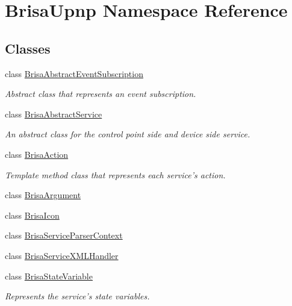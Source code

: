 \hypertarget{namespaceBrisaUpnp}{
\section{BrisaUpnp Namespace Reference}
\label{namespaceBrisaUpnp}
}
\subsection*{Classes}
\begin{DoxyCompactItemize}
\item 
class \hyperlink{classBrisaUpnp_1_1BrisaAbstractEventSubscription}{BrisaAbstractEventSubscription}
\begin{DoxyCompactList}\small\item\em Abstract class that represents an event subscription. \item\end{DoxyCompactList}\item 
class \hyperlink{classBrisaUpnp_1_1BrisaAbstractService}{BrisaAbstractService}
\begin{DoxyCompactList}\small\item\em An abstract class for the control point side and device side service. \item\end{DoxyCompactList}\item 
class \hyperlink{classBrisaUpnp_1_1BrisaAction}{BrisaAction}
\begin{DoxyCompactList}\small\item\em Template method class that represents each service's action. \item\end{DoxyCompactList}\item 
class \hyperlink{classBrisaUpnp_1_1BrisaArgument}{BrisaArgument}
\item 
class \hyperlink{classBrisaUpnp_1_1BrisaIcon}{BrisaIcon}
\item 
class \hyperlink{classBrisaUpnp_1_1BrisaServiceParserContext}{BrisaServiceParserContext}
\item 
class \hyperlink{classBrisaUpnp_1_1BrisaServiceXMLHandler}{BrisaServiceXMLHandler}
\item 
class \hyperlink{classBrisaUpnp_1_1BrisaStateVariable}{BrisaStateVariable}
\begin{DoxyCompactList}\small\item\em Represents the service's state variables. \item\end{DoxyCompactList}\item 

\end{DoxyCompactItemize}
